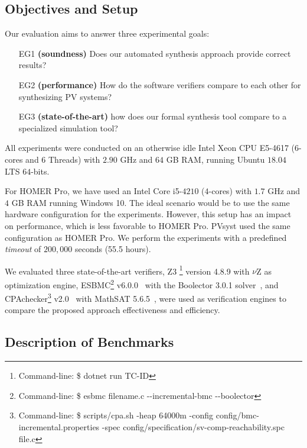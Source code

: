 \documentclass[journal]{IEEEtran}
\begin{document}
\subsection{Objectives and Setup}
\label{ObjectivesAndSetup}

Our evaluation aims to answer three experimental goals: 

\begin{enumerate}
\item [EG1] \textbf{(soundness)} Does our automated synthesis approach provide correct results?
\item [EG2] \textbf{(performance)} How do the software verifiers compare to each other for synthesizing PV systems?
\item [EG3] \textbf{(state-of-the-art)} how does our formal synthesis tool compare to a specialized simulation tool?
\end{enumerate}

All experiments were conducted on an otherwise idle Intel Xeon CPU E5-4617 ($6$-cores and 6 Threads) with $2.90$ GHz and $64$ GB RAM, running Ubuntu $18.04$ LTS $64$-bits. 

For HOMER Pro, we have used an Intel Core i5-$4210$ ($4$-cores) with $1.7$ GHz and $4$ GB RAM running Windows 10. The ideal scenario would be to use the same hardware configuration for the experiments. However, this setup has an impact on performance, which is less favorable to HOMER Pro. PVsyst used the same configuration as HOMER Pro. We perform the experiments with a predefined \textit{timeout} of $200,000$ seconds (55.5 hours).\color{black}

We evaluated three state-of-the-art verifiers, Z3 \footnote{Command-line: \$ dotnet run TC-ID} version 4.8.9 with $\nu$Z as optimization engine, ESBMC\footnote{Command-line: \$ esbmc filename.c -\phantom{}-incremental-bmc -\phantom{}-boolector} v6.0.0~\cite{esbmc2018} with the Boolector 3.0.1 solver~\cite{Brummayer}, and CPAchecker\footnote{Command-line: \$ scripts/cpa.sh -heap 64000m -config config/bmc-incremental.properties -spec config/specification/sv-comp-reachability.spc file.c} v2.0~\cite{Beyer2011} with MathSAT 5.6.5~\cite{mathsat5}, were used as verification engines to compare the proposed approach effectiveness and efficiency.

\subsection{Description of Benchmarks}
\end{document}
